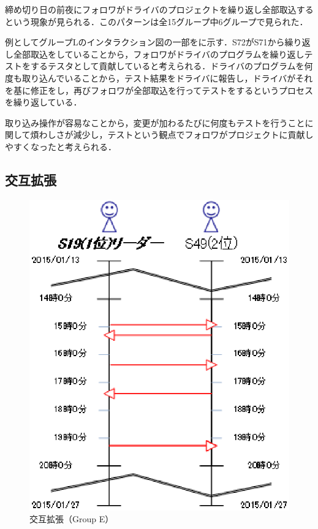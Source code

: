 締め切り日の前夜にフォロワがドライバのプロジェクトを繰り返し全部取込するという現象が見られる．このパターンは全15グループ中6グループで見られた．

例としてグループLのインタラクション図の一部をに示す．S72がS71から繰り返し全部取込をしていることから，フォロワがドライバのプログラムを繰り返しテストをするテスタとして貢献していると考えられる．ドライバのプログラムを何度も取り込んでいることから，テスト結果をドライバに報告し，ドライバがそれを基に修正をし，再びフォロワが全部取込を行ってテストをするというプロセスを繰り返している．

取り込み操作が容易なことから，変更が加わるたびに何度もテストを行うことに関して煩わしさが減少し，テストという観点でフォロワがプロジェクトに貢献しやすくなったと考えられる．


\subsection{交互拡張}\label{Alternate extension}

\begin{figure}[h]
	\begin{center}
		\includegraphics[scale=0.75]{img/flowE.eps}
		\caption{交互拡張（Group E）}
		\label{fig:flowE}
	\end{center}
\end{figure}

